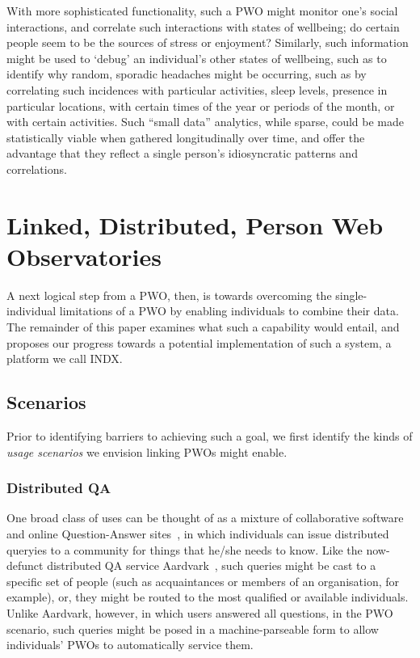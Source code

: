 \documentclass{sig-alternate}
\begin{document}
With more sophisticated functionality, such a PWO might monitor one's social interactions, and correlate such interactions with states of wellbeing; do certain people seem to be the sources of stress or enjoyment? Similarly, such information might be used to `debug' an individual's other states of wellbeing, such as to identify why random, sporadic headaches might be occurring, such as by correlating such incidences with particular activities, sleep levels, presence in particular locations, with certain times of the year or periods of the month, or with certain activities. Such ``small data'' analytics, while sparse, could be made statistically viable when gathered longitudinally over time, and offer the advantage that they reflect a single person's idiosyncratic patterns and correlations.

\section{Linked, Distributed, Person Web Observatories}

A next logical step from a PWO, then, is towards overcoming the single-individual limitations of a PWO by enabling individuals to combine their data.  The remainder of this paper examines what such a capability would entail, and proposes our progress towards a potential implementation of such a system, a platform we call INDX. 

\subsection{Scenarios}

Prior to identifying barriers to achieving such a goal, we first identify the kinds of \emph{usage scenarios} we envision linking PWOs might enable.  

\subsubsection{Distributed QA}

One broad class of uses can be thought of as a mixture of collaborative software and online Question-Answer sites~\cite{harper2009facts}, in which individuals can issue distributed queryies to a community for things that he/she needs to know.  Like the now-defunct distributed QA service Aardvark~\cite{horowitz2010anatomy}, such queries might be cast to a specific set of people (such as acquaintances or members of an organisation, for example), or, they might be routed to the most qualified or available individuals.  Unlike Aardvark, however, in which users answered all questions, in the PWO scenario, such queries might be posed in a machine-parseable form to allow individuals' PWOs to automatically service them.
\end{document}
